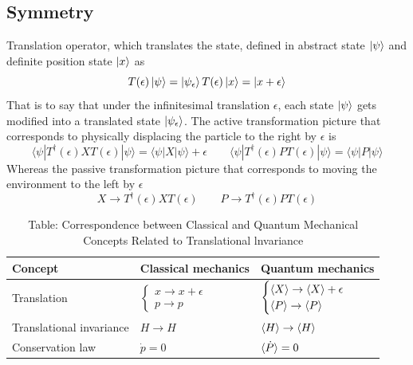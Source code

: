 \documentclass[../../../main.tex]{subfiles}
\begin{document}
\subsection{Symmetry}
Translation operator, which translates the state, defined in abstract state $\ket{\psi}$ and definite position state $\ket{x}$ as 
\begin{equation*}
    T(\epsilon) \ket{\psi} = \ket{\psi_\epsilon}
    T(\epsilon) \ket{x} = \ket{x+\epsilon}
\end{equation*}
That is to say that under the infinitesimal translation $\epsilon$, each state $\ket{\psi}$ gets modified into a translated state $\ket{\psi_\epsilon}$.
The active transformation picture  that corresponds to physically displacing the particle to the right by $\epsilon$ is 
\begin{equation*}
    \langle \psi|T^\dagger(\epsilon) X T(\epsilon)|\psi\rangle = \langle \psi|X|\psi\rangle + \epsilon \qquad
\langle \psi|T^\dagger(\epsilon) P T(\epsilon)|\psi\rangle = \langle \psi|P|\psi\rangle
\end{equation*}
Whereas the passive transformation picture that corresponds to moving the environment to the left by $\epsilon$
\begin{equation*}
    X \to T^{\dagger}(\epsilon)XT(\epsilon) \qquad P \to T^{\dagger}(\epsilon)PT(\epsilon)
\end{equation*}

\begin{table}[]
  \centering
  \caption*{Table: Correspondence between Classical and Quantum Mechanical Concepts Related to
Translational lnvariance}
  \begin{tabular}{@{}lll@{}}
    \toprule
    Concept & Classical mechanics & Quantum mechanics \\
    \midrule
    Translation &  $\begin{cases} x\to x+\epsilon\\ p \to p\end{cases}$& $\begin{cases}\braket{X} \to \braket{X}+\epsilon\\\braket{P }\to \braket{P }\end{cases}$\\
    Translational invariance & $H\to H$& $\braket{H }\to \braket{H }$\\
    Conservation law & $\dot{p} = 0$ & $\braket{\dot{P}  }=0$\\
    \bottomrule
  \end{tabular}
\end{table}
\end{document}
